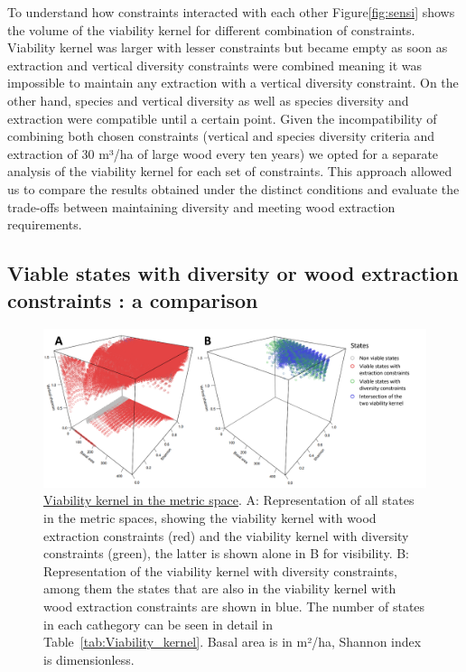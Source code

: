\documentclass{article}
\begin{document}
To understand how constraints interacted with each other Figure\ref{fig:sensi} shows the volume of the viability kernel for different combination of constraints. Viability kernel was larger with lesser constraints but became empty as soon as extraction and vertical diversity constraints were combined meaning it was impossible to maintain any extraction with a vertical diversity constraint. On the other hand, species and vertical diversity as well as species diversity and extraction were compatible until a certain point. Given the incompatibility of combining both chosen constraints (vertical and species diversity criteria and extraction of 30 m³/ha of large wood every ten years) we opted for a separate analysis of the viability kernel for each set of constraints. This approach allowed us to compare the results obtained under the distinct conditions and evaluate the trade-offs between maintaining diversity and meeting wood extraction requirements.

\subsection{Viable states with diversity or wood extraction constraints : a comparison}

\begin{figure}[hb!]
    \centering
    \includegraphics[width=\textwidth]{Figure/Results/Viability_kernel.png}
    \caption{\underline{Viability kernel in the metric space}. A: Representation of all states in the metric spaces, showing the viability kernel with wood extraction constraints (red) and the viability kernel with diversity constraints (green), the latter is shown alone in B for visibility. B: Representation of the viability kernel with diversity constraints, among them the states that are also in the viability kernel with wood extraction constraints are shown in blue. The number of states in each cathegory can be seen in detail in Table~\ref{tab:Viability_kernel}. Basal area is in m²/ha, Shannon index is dimensionless.}
    \label{fig:Viability_kernel}
\end{figure}
\end{document}
